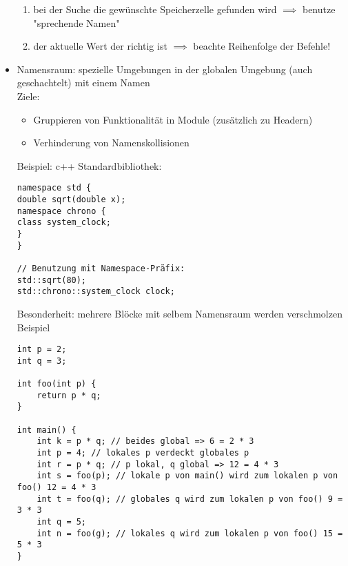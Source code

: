 \documentclass[a4paper]{scrartcl}
\theoremstyle{definition}
\theoremstyle{plain}
\theoremstyle{remark}
\theoremstyle{remark}
\begin{document}
\begin{itemize}
\begin{enumerate}
\item bei der Suche die gewünschte Speicherzelle gefunden wird $\implies$ benutze "sprechende Namen"
\item der aktuelle Wert der richtig ist $\implies$ beachte Reihenfolge der Befehle!
\end{enumerate}
\item Namensraum: spezielle Umgebungen in der globalen Umgebung (auch geschachtelt) mit einem Namen \\
    Ziele:
\begin{itemize}
\item Gruppieren von Funktionalität in Module (zusätzlich zu Headern)
\item Verhinderung von Namenskollisionen
\end{itemize}
Beispiel: c++ Standardbibliothek:
\begin{verbatim}
namespace std {
double sqrt(double x);
namespace chrono {
class system_clock;
}
}

// Benutzung mit Namespace-Präfix:
std::sqrt(80);
std::chrono::system_clock clock;
\end{verbatim}
 Besonderheit: mehrere Blöcke mit selbem Namensraum werden verschmolzen
Beispiel
\begin{verbatim}
int p = 2;
int q = 3;

int foo(int p) {
	return p * q;
}

int main() {
	int k = p * q; // beides global => 6 = 2 * 3
	int p = 4; // lokales p verdeckt globales p
	int r = p * q; // p lokal, q global => 12 = 4 * 3
	int s = foo(p); // lokale p von main() wird zum lokalen p von foo() 12 = 4 * 3
	int t = foo(q); // globales q wird zum lokalen p von foo() 9 = 3 * 3
	int q = 5;
	int n = foo(g); // lokales q wird zum lokalen p von foo() 15 = 5 * 3
}
\end{verbatim}
\end{itemize}
\end{document}
